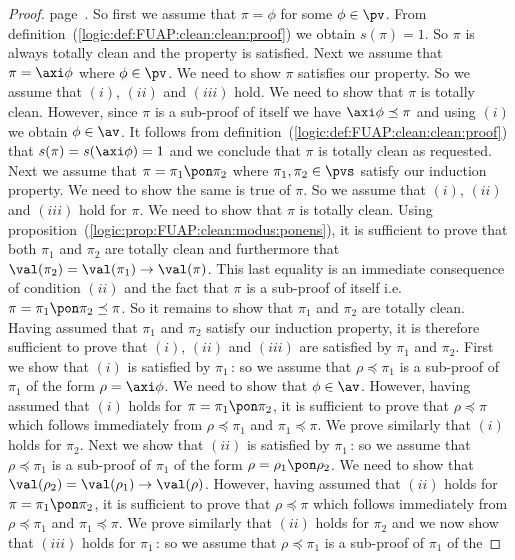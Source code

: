 \begin{proof}
page~\pageref{logic:the:proof:induction}. So first we assume that
$\pi=\phi$ for some $\phi\in\pv$. From
definition~(\ref{logic:def:FUAP:clean:clean:proof}) we obtain
$s(\pi)=1$. So $\pi$ is always totally clean and the property is
satisfied. Next we assume that $\pi=\axi\phi$ where $\phi\in\pv$. We
need to show $\pi$ satisfies our property. So we assume that $(i)$,
$(ii)$ and $(iii)$ hold. We need to show that $\pi$ is totally
clean. However, since $\pi$ is a sub-proof of itself we have
$\axi\phi\preceq\pi$ and using $(i)$ we obtain $\phi\in\av$. It
follows from definition~(\ref{logic:def:FUAP:clean:clean:proof})
that $s(\pi)=s(\axi\phi)=1$ and we conclude that $\pi$ is totally
clean as requested. Next we assume that $\pi=\pi_{1}\pon\pi_{2}$
where $\pi_{1},\pi_{2}\in\pvs$ satisfy our induction property. We
need to show the same is true of $\pi$. So we assume that $(i)$,
$(ii)$ and $(iii)$ hold for $\pi$. We need to show that $\pi$ is
totally clean. Using
proposition~(\ref{logic:prop:FUAP:clean:modus:ponens}), it is
sufficient to prove that both $\pi_{1}$ and $\pi_{2}$ are totally
clean and furthermore that
$\val(\pi_{2})=\val(\pi_{1})\to\val(\pi)$. This last equality is an
immediate consequence of condition $(ii)$ and the fact that $\pi$ is
a sub-proof of itself i.e. $\pi=\pi_{1}\pon\pi_{2}\preceq\pi$. So it
remains to show that $\pi_{1}$ and $\pi_{2}$ are totally clean.
Having assumed that $\pi_{1}$ and $\pi_{2}$ satisfy our induction
property, it is therefore sufficient to prove that $(i)$, $(ii)$ and
$(iii)$ are satisfied by $\pi_{1}$ and $\pi_{2}$. First we show that
$(i)$ is satisfied by $\pi_{1}$\,: so we assume that
$\rho\preceq\pi_{1}$ is a sub-proof of $\pi_{1}$ of the form
$\rho=\axi\phi$. We need to show that $\phi\in\av$. However, having
assumed that $(i)$ holds for $\pi=\pi_{1}\pon\pi_{2}$, it is
sufficient to prove that $\rho\preceq\pi$ which follows immediately
from $\rho\preceq\pi_{1}$ and $\pi_{1}\preceq\pi$. We prove
similarly that $(i)$ holds for $\pi_{2}$. Next we show that $(ii)$
is satisfied by $\pi_{1}$\,: so we assume that $\rho\preceq\pi_{1}$
is a sub-proof of $\pi_{1}$ of the form $\rho=\rho_{1}\pon\rho_{2}$.
We need to show that $\val(\rho_{2})=\val(\rho_{1})\to\val(\rho)$.
However, having assumed that $(ii)$ holds for
$\pi=\pi_{1}\pon\pi_{2}$, it is sufficient to prove that
$\rho\preceq\pi$ which follows immediately from $\rho\preceq\pi_{1}$
and $\pi_{1}\preceq\pi$. We prove similarly that $(ii)$ holds for
$\pi_{2}$ and we now show that $(iii)$ holds for $\pi_{1}$\,: so we
assume that $\rho\preceq\pi_{1}$ is a sub-proof of $\pi_{1}$ of the

\end{proof}
